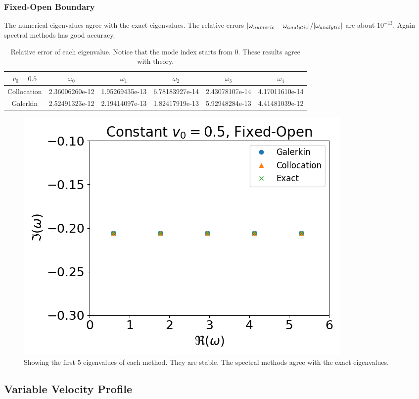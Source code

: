 \subsubsection*{Fixed-Open Boundary}
The numerical eigenvalues agree with the exact eigenvalues. The relative errors $\abs{\omega_{numeric} -\omega_{analytic}}/\abs{\omega_{analytic}}$ are about $10^{-13}$. Again spectral methods has good accuracy.
\begin{table} [H]
	\centering
	\caption{Relative error of each eigenvalue. Notice that the mode index starts from 0. These results agree with theory.}
	\begin{tabular}{|c|c|c|c|c|c|}
		\hline
		$v_0=0.5$   & $\omega_0$     & $\omega_1$     & $\omega_2$     & $\omega_3$     & $\omega_4$     \\
		\hline
		Collocation & 2.36006260e-12 & 1.95269435e-13 & 6.78183927e-14 & 2.43078107e-14 & 4.17011610e-14 \\
		\hline
		Galerkin    & 2.52491323e-12 & 2.19414097e-13 & 1.82417919e-13 & 5.92948284e-13 & 4.41481039e-12 \\
		\hline
	\end{tabular}
	\label{table:eigenvalue-error-fixed-open-subsonic}
\end{table}

\begin{figure}[H]
	\centering
	\includegraphics[width=0.7\linewidth]{figures/constant-subsonic-fixed-open.png}
	\caption{Showing the first 5 eigenvalues of each method. They are stable. The spectral methods agree with the exact eigenvalues.}
	\label{fig:constant-subsoniv-fixed-open}
\end{figure}


\subsection{Variable Velocity Profile}
